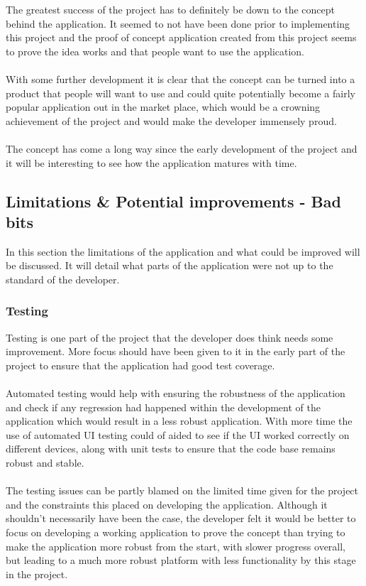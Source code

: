 The greatest success of the project has to definitely be down to the concept behind the application. It seemed to not have been done prior to implementing this project and the proof of concept application created from this project seems to prove the idea works and that people want to use the application.\\
\\
With some further development it is clear that the concept can be turned into a product that people will want to use and could quite potentially become a fairly popular application out in the market place, which would be a crowning achievement of the project and would make the developer immensely proud.\\
\\
The concept has come a long way since the early development of the project and it will be interesting to see how the application matures with time.

\subsection{Limitations \& Potential improvements - Bad bits}

In this section the limitations of the application and what could be improved will be discussed. It will detail what parts of the application were not up to the standard of the developer.

\subsubsection{Testing}

Testing is one part of the project that the developer does think needs some improvement. More focus should have been given to it in the early part of the project to ensure that the application had good test coverage.\\
\\
Automated testing would help with ensuring the robustness of the application and check if any regression had happened within the development of the application which would result in a less robust application. With more time the use of automated UI testing could of aided to see if the UI worked correctly on different devices, along with unit tests to ensure that the code base remains robust and stable.\\
\\
The testing issues can be partly blamed on the limited time given for the project and the constraints this placed on developing the application. Although it shouldn't necessarily have been the case, the developer felt it would be better to focus on developing a working application to prove the concept than trying to make the application more robust from the start, with slower progress overall, but leading to a much more robust platform with less functionality by this stage in the project.

